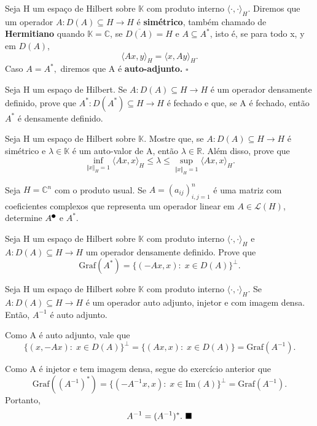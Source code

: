 \documentclass[../functional_analysis.tex]{subfiles}
\begin{document}
\begin{def*}
	Seja H um espaço de Hilbert sobre \(\mathbb{K}\) com produto interno \(\langle \cdot , \cdot  \rangle_{H}\). Diremos que um operador
	\(A:D(A)\subseteq H\rightarrow H\) é \textbf{simétrico}, também chamado de \textbf{Hermitiano} quando \(\mathbb{K} = \mathbb{C}\), se
	\(\overline{D(A)} = H\) e \(A\subseteq A^{*}\), isto é, se para todo x, y em \(D(A)\),
	\[
		\langle Ax, y \rangle_{H} = \langle x, Ay \rangle_{H}.
	\]
	Caso \(A = A^{*},\) diremos que A é \textbf{auto-adjunto.} \(\square\)
\end{def*}
\begin{exr}
	Seja H um espaço de Hilbert. Se \(A:D(A)\subseteq H\rightarrow H\) é um operador densamente definido, prove que \(A^{*}:D(A^{*})\subseteq H\rightarrow H\) é fechado e que, se A é fechado, então \(A^{*}\) é
	densamente definido.
\end{exr}
\begin{exr}
	Seja H um espaço de Hilbert sobre \(\mathbb{K}\). Mostre que, se \(A:D(A)\subseteq H\rightarrow H\) é simétrico e \(\lambda \in \mathbb{K}\) é um auto-valor de A, então \(\lambda \in \mathbb{R}\). Além disso, prove que
	\[
		\inf_{\Vert x \Vert_{H} = 1} \langle Ax, x \rangle_{H} \leq \lambda \leq \sup_{\Vert x \Vert_{H} = 1}\langle Ax, x \rangle_{H}.
	\]
\end{exr}
\begin{exr}
	Seja \(H = \mathbb{C}^{n}\) com o produto usual. Se \(A = (a_{ij})_{i, j=1}^{n}\) é uma matriz com coeficientes complexos que representa um operador linear em \(A\in \mathcal{L}(H)\),
	determine \(A^{\tikz[baseline=-0.5ex]\draw[black, fill=black, radius=2pt](0, 0)circle;}\) e \(A^{*}.\)
\end{exr}
\begin{exr}
	Seja H um espaço de Hilbert sobre \(\mathbb{K}\) com produto interno \(\langle \cdot , \cdot  \rangle_{H}\) e
	\(A:D(A)\subseteq H\rightarrow H\) um operador densamente definido. Prove que
	\[
		\mathrm{Graf}(A^{*}) = \{(-Ax, x):\; x\in D(A)\}^{\perp }.
	\]
\end{exr}
\begin{prop*}
	Seja H um espaço de Hilbert sobre \(\mathbb{K}\) com produto interno \(\langle \cdot , \cdot  \rangle_{H}\). Se
	\(A:D(A)\subseteq H\rightarrow H\) é um operador auto adjunto, injetor e com imagem densa. Então, \(A^{-1}\) é
	auto adjunto.
\end{prop*}
\begin{proof*}
	Como A é auto adjunto, vale que
	\[
		\{(x, -Ax):\; x\in D(A)\}^{\perp } = \{(Ax, x):\; x\in D(A)\} = \mathrm{Graf}(A^{-1}).
	\]

	Como A é injetor e tem imagem densa, segue do exercício anterior que
	\[
		\mathrm{Graf}((A^{-1})^{*}) = \{(-A^{-1}x, x):\; x\in \mathrm{Im}(A)\}^{\perp } = \mathrm{Graf}(A^{-1}).
	\]
	Portanto,
	\[
		A^{-1} = (A^{-1})^{*}. \text{ $\blacksquare$}
	\]
\end{proof*}
\end{document}
